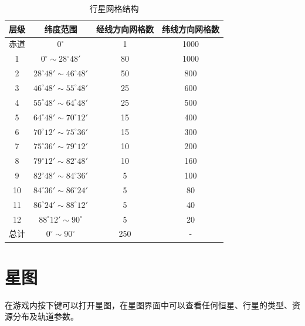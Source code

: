 \begin{table}[ht]
    \small
    \centering
    \caption{行星网格结构}
    \label{tbl:network-structure}
    \begin{tabular}{cccc}
        \toprule
        层级 & 纬度范围 & 经线方向网格数 & 纬线方向网格数 \\
        \midrule
        赤道 & $0^\circ$ & 1 & 1000 \\
        1 & $0^\circ \sim 28^\circ 48'$ & 80 & 1000 \\
        2 & $28^\circ 48'\sim 46^\circ 48'$ & 50 & 800 \\
        3 & $46^\circ 48'\sim 55^\circ 48'$ & 25 & 600 \\
        4 & $55^\circ 48'\sim 64^\circ 48'$ & 25 & 500 \\
        5 & $64^\circ 48'\sim 70^\circ 12'$ & 15 & 400 \\
        6 & $70^\circ 12'\sim 75^\circ 36'$ & 15 & 300 \\
        7 & $75^\circ 36'\sim 79^\circ 12'$ & 10 & 200 \\
        8 & $79^\circ 12'\sim 82^\circ 48'$ & 10 & 160 \\
        9 & $82^\circ 48'\sim 84^\circ 36'$ & 5 & 100 \\
        10 & $84^\circ 36'\sim 86^\circ 24'$ & 5 & 80 \\
        11 & $86^\circ 24'\sim 88^\circ 12'$ & 5 & 40 \\
        12 & $88^\circ 12'\sim 90^\circ$ & 5 & 20 \\
        \midrule
        总计 & $0^\circ \sim 90^\circ$ & 250 & - \\
        \bottomrule
    \end{tabular}
\end{table}

\section{星图}

在游戏内按下键可以打开星图，在星图界面中可以查看任何恒星、行星的类型、资源分布及轨道参数。

